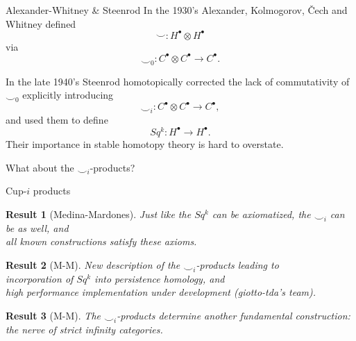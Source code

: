 \documentclass[10pt,t]{beamer} %
\newtheorem{result}{Result}
\begin{document}
\begin{frame}[c]{Alexander-Whitney \& Steenrod}
	\vskip -9pt
	In the 1930's Alexander, Kolmogorov, \v{C}ech and Whitney defined
	\begin{equation*}
	\smallsmile \colon H^\bullet \otimes H^\bullet
	\end{equation*}
	\vskip -9pt
	via
	\vskip -9pt
	\begin{equation*}
	\smallsmile_0 \colon C^\bullet \otimes C^\bullet \to C^\bullet.
	\end{equation*}
	
	\vskip 5pt
	\pause
	
	In the late 1940's Steenrod homotopically corrected the lack of commutativity of $\smallsmile_0$ explicitly introducing
	\begin{equation*}
	\smallsmile_i \colon C^\bullet \otimes C^\bullet \to C^\bullet,
	\end{equation*}
	and used them to define
	\begin{equation*}
	Sq^k \colon H^\bullet \to H^\bullet.
	\end{equation*}
	Their importance in stable homotopy theory is hard to overstate.
	
	\vskip 15pt
	\pause
	
	 \textcolor{pblue}{What about the $\smallsmile_i$-products?}
\end{frame}

\begin{frame}[c]{Cup-$i$ products}
	
	\vskip -10pt
	\begin{result}[Medina-Mardones]
		Just like the $Sq^k$ can be axiomatized, the $\smallsmile_i$ can be as well, and\\ all known constructions satisfy these axioms.
	\end{result}

	\pause
	\vskip 10pt
	
	\begin{result}[M-M]
		New description of the $\smallsmile_i$-products leading to \\
		incorporation of $Sq^k$ into persistence homology, and \\
		high performance implementation under development (giotto-tda's team).
	\end{result}
	
	\pause
	\vskip 10pt
	
	\begin{result}[M-M]
		The $\smallsmile_i$-products determine another fundamental construction: the nerve of strict infinity categories.
	\end{result}
\end{frame}
\end{document}
